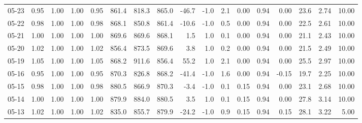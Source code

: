 \begin{threeparttable}
{\begin{tabular}{lrrrrrrrrrrrrrrrr}
  05-23 &         0.95 &           1.00 &          1.00 &          0.95 & 861.4 & 818.3 & 865.0 &      -46.7 &                     -1.0 &                 2.1 &       0.00 &      0.94 &           0.00 &             23.6 &            2.74 &                  10.00 \\
  05-22 &         0.98 &           1.00 &          1.00 &          0.98 & 868.1 & 850.8 & 861.4 &      -10.6 &                     -1.0 &                 0.5 &       0.00 &      0.94 &           0.00 &             22.5 &            2.61 &                  10.00 \\
  05-21 &         1.00 &           1.00 &          1.00 &          1.00 & 869.6 & 869.6 & 868.1 &        1.5 &                      1.0 &                 0.1 &       0.00 &      0.94 &           0.00 &             21.1 &            2.43 &                  10.00 \\
  05-20 &         1.02 &           1.00 &          1.00 &          1.02 & 856.4 & 873.5 & 869.6 &        3.8 &                      1.0 &                 0.2 &       0.00 &      0.94 &           0.00 &             21.5 &            2.49 &                  10.00 \\
  05-19 &         1.05 &           1.00 &          1.00 &          1.05 & 868.2 & 911.6 & 856.4 &       55.2 &                      1.0 &                 2.1 &       0.00 &      0.94 &           0.00 &             25.5 &            2.97 &                  10.00 \\
  05-16 &         0.95 &           1.00 &          1.00 &          0.95 & 870.3 & 826.8 & 868.2 &      -41.4 &                     -1.0 &                 1.6 &       0.00 &      0.94 &          -0.15 &             19.7 &            2.25 &                  10.00 \\
  05-15 &         0.98 &           1.00 &          1.00 &          0.98 & 880.5 & 866.9 & 870.3 &       -3.4 &                     -1.0 &                 0.1 &       0.15 &      0.94 &           0.00 &             23.1 &            2.68 &                  10.00 \\
  05-14 &         1.00 &           1.00 &          1.00 &          1.00 & 879.9 & 884.0 & 880.5 &        3.5 &                      1.0 &                 0.1 &       0.15 &      0.94 &           0.00 &             27.8 &            3.14 &                  10.00 \\
  05-13 &         1.02 &           1.00 &          1.00 &          1.02 & 835.0 & 855.7 & 879.9 &      -24.2 &                     -1.0 &                 0.9 &       0.15 &      0.94 &           0.15 &             28.1 &            3.22 &                   5.00 \\

\end{tabular}}
\end{threeparttable}
